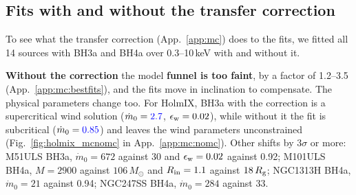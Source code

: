 \subsection{Fits with and without the transfer correction}
\label{sec:results:mcnomc}

To see what the transfer correction (App.~\ref{app:mc}) does to the fits, we fitted all 14 sources with BH3a and BH4a over 0.3--10\,keV with and without it.

\textbf{Without the correction} the model \textbf{funnel is too faint}, by a factor of 1.2--3.5 (App.~\ref{app:mc:bestfits}), and the fits move in inclination to compensate.
The physical parameters change too.
For HolmIX, BH3a with the correction is a supercritical wind solution ($\dot m_0 = {\color{blue}2.7}$, $\epsilon_{\rm w} = 0.02$), while without it the fit is subcritical ($\dot m_0 = {\color{blue}0.85}$) and leaves the wind parameters unconstrained (Fig.~\ref{fig:holmix_mcnomc} in App.~\ref{app:mc:nomc}).
Other shifts by $3\sigma$ or more: M51ULS BH3a, $\dot m_0 = 672$ against 30 and $\epsilon_{\rm w} = 0.02$ against 0.92; M101ULS BH4a, $M = 2900$ against $106\,M_\odot$ and $R_{\rm in} = 1.1$ against $18\,R_{\rm g}$; NGC1313H BH4a, $\dot m_0 = 21$ against 0.94; NGC247SS BH4a, $\dot m_0 = 284$ against 33.
